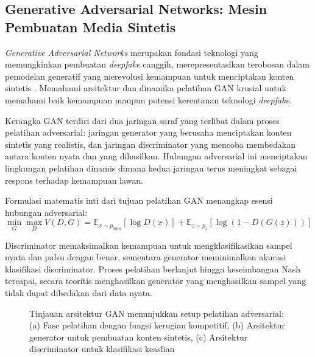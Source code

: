\subsection{Generative Adversarial Networks: Mesin Pembuatan Media Sintetis}

\textit{Generative Adversarial Networks} merupakan fondasi teknologi yang memungkinkan pembuatan \textit{deepfake} canggih, merepresentasikan terobosan dalam pemodelan generatif yang merevolusi kemampuan untuk menciptakan konten sintetis \cite{goodfellow2014generative}. Memahami arsitektur dan dinamika pelatihan GAN krusial untuk memahami baik kemampuan maupun potensi kerentanan teknologi \textit{deepfake}.

Kerangka GAN terdiri dari dua jaringan saraf yang terlibat dalam proses pelatihan adversarial: jaringan generator yang berusaha menciptakan konten sintetis yang realistis, dan jaringan discriminator yang mencoba membedakan antara konten nyata dan yang dihasilkan. Hubungan adversarial ini menciptakan lingkungan pelatihan dinamis dimana kedua jaringan terus meningkat sebagai respons terhadap kemampuan lawan.

Formulasi matematis inti dari tujuan pelatihan GAN menangkap esensi hubungan adversarial:
\begin{equation}
\min_G \max_D V(D,G) = \mathbb{E}_{x \sim p_{data}}[\log D(x)] + \mathbb{E}_{z \sim p_z}[\log(1-D(G(z)))]
\label{eq:gan_objective}
\end{equation}

Discriminator memaksimalkan kemampuan untuk mengklasifikasikan sampel nyata dan palsu dengan benar, sementara generator meminimalkan akurasi klasifikasi discriminator. Proses pelatihan berlanjut hingga keseimbangan Nash tercapai, secara teoritis menghasilkan generator yang menghasilkan sampel yang tidak dapat dibedakan dari data nyata.

\begin{figure}[H]
    \centering
    \caption{Tinjauan arsitektur GAN menunjukkan setup pelatihan adversarial: (a) Fase pelatihan dengan fungsi kerugian kompetitif, (b) Arsitektur generator untuk pembuatan konten sintetis, (c) Arsitektur discriminator untuk klasifikasi keaslian}
    \label{fig:gan_architecture}
\end{figure}


